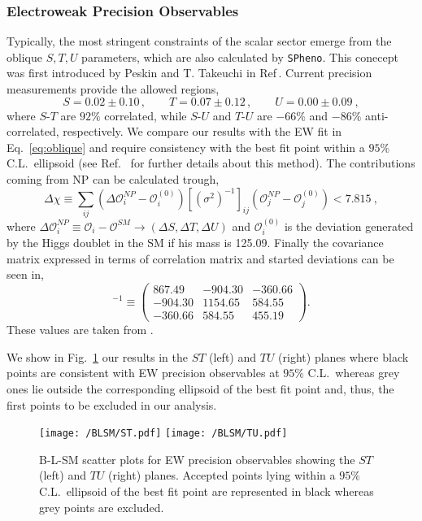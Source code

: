 \subsubsection{Electroweak Precision Observables}
\label{Sec:B-L-SM-EW}
Typically, the most stringent constraints of the scalar sector emerge from the oblique $S,T,U$ parameters, which are also calculated by \texttt{SPheno}. 
%
This conecept was first introduced by Peskin and T. Takeuchi in Ref\,\cite{Peskin1992}.
%
Current precision measurements provide the allowed regions,
%
\begin{equation}
	S = 0.02 \pm 0.10\,, \qquad T = 0.07 \pm 0.12\,, \qquad U = 0.00 \pm 0.09 \ ,
	\label{eq:oblique}
\end{equation}
%
where $S$-$T$ are $92\%$ correlated, while $S$-$U$ and $T$-$U$ are $-66\%$ and $-86\%$ anti-correlated, respectively.
%
We compare our results with the EW fit in Eq.~\eqref{eq:oblique} and require consistency with the best fit point within a $95\%$ C.L.~ellipsoid (see Ref.~\cite{Costa:2014qga} for further details about this method). %
%
The contributions coming from NP can be calculated trough,
%
\begin{equation}
\Delta \chi \equiv \sum_{ij}  \left(  \Delta \mathcal{O}_{i}^{NP} - \mathcal{O}_{i}^{(0)} \right) [ ( \sigma^2 )^{-1} ]_{ij}  \left(  \mathcal{O}_{j}^{NP} - \mathcal{O}_{j}^{(0)}  \right) < 7.815 \ , 
\end{equation}
%
where $\Delta \mathcal{O}_i^{NP} \equiv \mathcal{O}_i - \mathcal{O}^{SM} \rightarrow (\Delta S , \Delta T , \Delta U )$ and $\mathcal{O}_i^{(0)}$ is the deviation generated by the Higgs doublet in the SM if his mass is 125.09. Finally the covariance matrix expressed in terms of correlation matrix and started deviations can be seen in, 
\begin{equation}
[ \sigma^2 ]^{-1} \equiv \begin{pmatrix}
867.49 & −904.30 & -360.66\\
−904.30 & 1154.65 & 584.55 \\
−360.66 & 584.55 &  455.19
\end{pmatrix} . 
\end{equation}
These values are taken from \cite{Baak_2012}. 

We show in Fig.~\ref{fig:STU} our results in the $ST$ (left) and $TU$ (right) planes where black points are consistent with EW precision observables at $95\%$ C.L.~whereas grey ones lie outside the corresponding ellipsoid of the best fit point and, thus, the first points to be excluded in our analysis. 
\begin{figure}[H]
	\centering
	\texttt{[image: /BLSM/ST.pdf]}
	\texttt{[image: /BLSM/TU.pdf]}
	\caption{B-L-SM scatter plots for EW precision observables showing the $ST$ (left) and $TU$ (right) planes. Accepted points lying within a $95\%$ C.L.~ellipsoid of the best fit point are represented in black whereas grey points are excluded.}
	\label{fig:STU}
\end{figure}	

